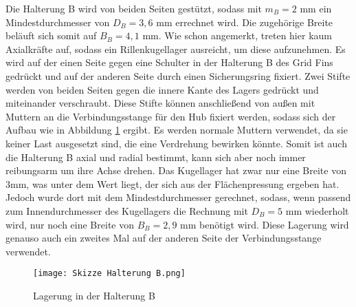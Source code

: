 Die Halterung B wird von beiden Seiten gestützt, sodass mit $m_B = 2$ mm ein Mindestdurchmesser von $D_B = 3,6$ mm errechnet wird. Die zugehörige Breite beläuft sich somit auf $B_B = 4,1$ mm. Wie schon angemerkt, treten hier kaum Axialkräfte auf, sodass ein Rillenkugellager ausreicht, um diese aufzunehmen. Es wird auf der einen Seite gegen eine Schulter in der Halterung B des Grid Fins gedrückt und auf der anderen Seite durch einen Sicherungsring fixiert. Zwei Stifte werden von beiden Seiten gegen die innere Kante des Lagers gedrückt und miteinander verschraubt. Diese Stifte können anschließend von außen mit Muttern an die Verbindungsstange für den Hub fixiert werden, sodass sich der Aufbau wie in Abbildung \ref{abb_Lager_HB} ergibt. Es werden normale Muttern verwendet, da sie keiner Last ausgesetzt sind, die eine Verdrehung bewirken könnte. Somit ist auch die Halterung B axial und radial bestimmt, kann sich aber noch immer reibungsarm um ihre Achse drehen. Das Kugellager hat zwar nur eine Breite von 3mm, was unter dem Wert liegt, der sich aus der Flächenpressung ergeben hat. Jedoch wurde dort mit dem Mindestdurchmesser gerechnet, sodass, wenn passend zum Innendurchmesser des Kugellagers die Rechnung mit $D_B = 5$ mm wiederholt wird, nur noch eine Breite von $B_B =2,9$ mm benötigt wird. Diese Lagerung wird genauso auch ein zweites Mal auf der anderen Seite der Verbindungsstange verwendet.
\begin{figure}[h] 
	\centering
	\texttt{[image: Skizze Halterung B.png]}
	\caption{Lagerung in der Halterung B}
	\label{abb_Lager_HB}
\end{figure}
